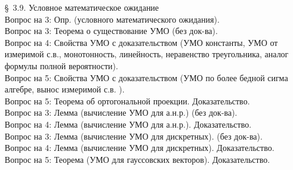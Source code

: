 \documentclass[10pt]{amsart}
\begin{document}
\begin{enumerate}
\begin{enumerate}
    
\item[\S\, 3.9.] Условное математическое ожидание \\
Вопрос на 3: Опр. (условного математического ожидания). \\
Вопрос на 3: Теорема о существование УМО (без док-ва). \\
Вопрос на 4: Свойства УМО с доказательством (УМО константы, УМО от измеримой с.в., монотонность,  линейность, неравенство треугольника,  аналог формулы полной вероятности). \\
Вопрос на 5: Свойства УМО с доказательством (УМО по более бедной сигма алгебре, вынос измеримой с.в. ). \\
Вопрос на 5: Теорема об ортогональной проекции. Доказательство. \\
Вопрос на 3: Лемма (вычисление УМО для а.н.р.)  (без док-ва). \\
Вопрос на 4: Лемма (вычисление УМО для а.н.р.). Доказательство. \\
Вопрос на 3: Лемма (вычисление УМО для дискретных). (без док-ва). \\
Вопрос на 4: Лемма (вычисление УМО для дискретных). Доказательство. \\
Вопрос на 5: Теорема (УМО для гауссовских векторов). Доказательство. \\










    \end{enumerate}
    

\end{enumerate}
\end{document}
